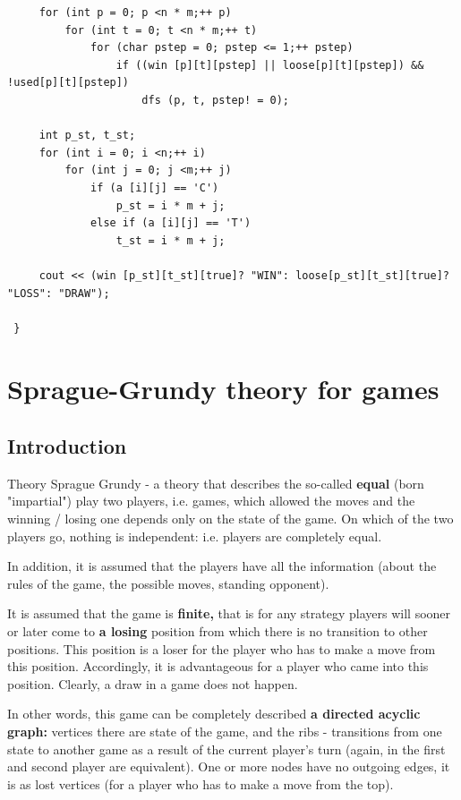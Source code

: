 \begin{verbatim}
     for (int p = 0; p <n * m;++ p)
         for (int t = 0; t <n * m;++ t)
             for (char pstep = 0; pstep <= 1;++ pstep)
                 if ((win [p][t][pstep] || loose[p][t][pstep]) && !used[p][t][pstep])
                     dfs (p, t, pstep! = 0);

     int p_st, t_st;
     for (int i = 0; i <n;++ i)
         for (int j = 0; j <m;++ j)
             if (a [i][j] == 'C')
                 p_st = i * m + j;
             else if (a [i][j] == 'T')
                 t_st = i * m + j;

     cout << (win [p_st][t_st][true]? "WIN": loose[p_st][t_st][true]? "LOSS": "DRAW");

 } 
\end{verbatim}

\section{ Sprague-Grundy theory for games }
\subsection{ Introduction }

Theory Sprague Grundy - a theory that describes the so-called \textbf{equal} (born "impartial") play two players, i.e. games, which allowed the moves and the winning / losing one depends only on the state of the game. On which of the two players go, nothing is independent: i.e. players are completely equal.

In addition, it is assumed that the players have all the information (about the rules of the game, the possible moves, standing opponent).

It is assumed that the game is \textbf{finite,} that is for any strategy players will sooner or later come to \textbf{a losing} position from which there is no transition to other positions. This position is a loser for the player who has to make a move from this position. Accordingly, it is advantageous for a player who came into this position. Clearly, a draw in a game does not happen.

In other words, this game can be completely described \textbf{a directed acyclic graph:} vertices there are state of the game, and the ribs - transitions from one state to another game as a result of the current player's turn (again, in the first and second player are equivalent). One or more nodes have no outgoing edges, it is as lost vertices (for a player who has to make a move from the top).

